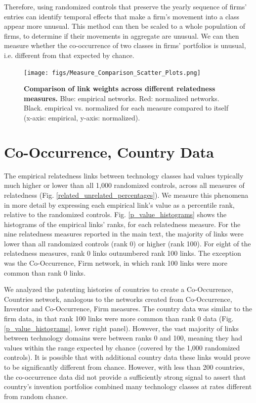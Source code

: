 \documentclass[pre,reprint,groupedaddress,superscriptaddress]{revtex4-1}
\begin{document}
Therefore, using randomized controls that preserve the yearly sequence of firms' entries can identify temporal effects that make a firm's movement into a class appear more unusual. This method can then be scaled to a whole population of firms, to determine if their movements in aggregate are unusual. We can then measure whether the co-occurrence of two classes in firms' portfolios is unusual, i.e. different from that expected by chance.

\begin{figure}[]
\centering
\texttt{[image: figs/Measure\_Comparison\_Scatter\_Plots.png]} 
\caption{\textbf{Comparison of link weights across different relatedness measures.} Blue: empirical networks. Red: normalized networks. Black. empirical vs. normalized for each measure compared to itself (x-axis: empirical, y-axis: normalized). 
}\label{Measure_Comparison_Scatter_Plots}
\end{figure}



\section{Co-Occurrence, Country Data}
The empirical relatedness links between technology classes had values typically much higher or lower than all 1,000 randomized controls, across all measures of relatedness (Fig. \ref{related_unrelated_percentages}). We measure this phenomena in more detail by expressing each empirical link's value as a percentile rank, relative to the randomized controls. Fig. \ref{p_value_histograms} shows the histograms of the empirical links' ranks, for each relatedness measure. For the nine relatedness measures reported in the main text, the majority of links were lower than all randomized controls (rank 0) or higher (rank 100). For eight of the relatedness measures, rank 0 links outnumbered rank 100 links. The exception was the Co-Occurrence, Firm network, in which rank 100 links were more common than rank 0 links.

We analyzed the patenting histories of countries to create a Co-Occurrence, Countries network, analogous to the networks created from Co-Occurrence, Inventor and Co-Occurrence, Firm measures. The country data was similar to the firm data, in that rank 100 links were more common than rank 0 data (Fig. \ref{p_value_histograms}, lower right panel). However, the vast majority of links between technology domains were between ranks 0 and 100, meaning they had values within the range expected by chance (covered by the 1,000 randomized controls). It is possible that with additional country data these links would prove to be significantly different from chance. However, with less than 200 countries, the co-occurrence data did not provide a sufficiently strong signal to assert that country's invention portfolios combined many technology classes at rates different from random chance.
\end{document}
